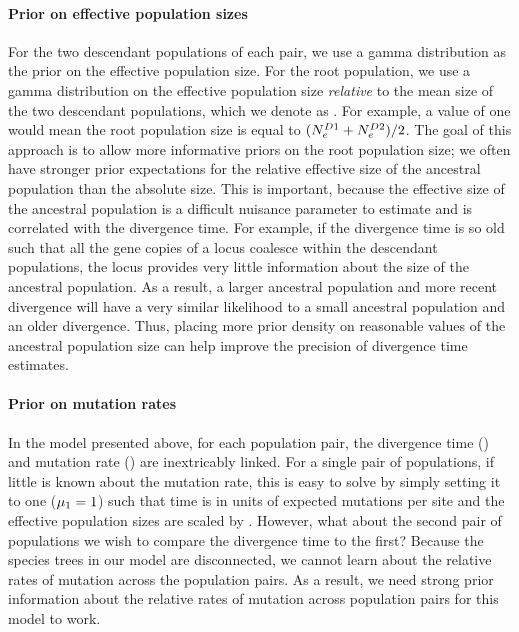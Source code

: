 \paragraph{Prior on effective population sizes}
For the two descendant populations of each pair, we use a gamma distribution as
the prior on the effective population size.
For the root population, we use a gamma distribution on the effective
population size \emph{relative} to the mean size of the two descendant
populations, which we denote as \rootrelativepopsize.
For example, a value of one would mean the root population size is equal to 
$(\epopsize[\descendantpopindex{1}] + \epopsize[\descendantpopindex{2}]) / 2$.
The goal of this approach is to allow more informative priors on the root
population size; we often have stronger prior expectations for the relative
effective size of the ancestral population than the absolute size.
This is important, because the effective size of the ancestral population is a
difficult nuisance parameter to estimate and is correlated with the divergence
time.
For example, if the divergence time is so old such that all the gene copies
of a locus coalesce within the descendant populations, the locus
provides very little information about the size of the ancestral
population.
As a result, a larger ancestral population and more recent divergence will have
a very similar likelihood to a small ancestral population and an older
divergence.
Thus, placing more prior density on reasonable values of the ancestral
population size can help improve the precision of divergence time estimates.

\paragraph{Prior on mutation rates}
In the model presented above, for each population pair, the divergence time
(\divtime) and mutation rate (\murate[i]) are inextricably linked.
For a single pair of populations, if little is known about the mutation rate,
this is easy to solve by simply setting it to one ($\murate[1] = 1$) such that
time is in units of expected mutations per site and the effective population
sizes are scaled by \murate.
However, what about the second pair of populations we wish to compare the
divergence time to the first?
Because the species trees in our model are disconnected, we cannot learn about
the relative rates of mutation across the population pairs.
As a result, we need strong prior information about the relative rates of
mutation across population pairs for this model to work.

